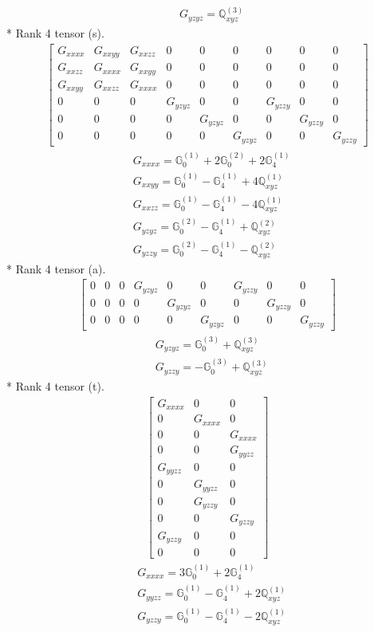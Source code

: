 \documentclass[fleqn,8pt,landscape]{jsarticle}
\begin{document}
\begin{align*}
& G_{yzyz} = \mathbb{Q}_{xyz}^{(3)}
\end{align*}
* Rank 4 tensor (s).
\begin{align*}
\begin{bmatrix} G_{xxxx} & G_{xxyy} & G_{xxzz} & 0 & 0 & 0 & 0 & 0 & 0 \\ G_{xxzz} & G_{xxxx} & G_{xxyy} & 0 & 0 & 0 & 0 & 0 & 0 \\ G_{xxyy} & G_{xxzz} & G_{xxxx} & 0 & 0 & 0 & 0 & 0 & 0 \\ 0 & 0 & 0 & G_{yzyz} & 0 & 0 & G_{yzzy} & 0 & 0 \\ 0 & 0 & 0 & 0 & G_{yzyz} & 0 & 0 & G_{yzzy} & 0 \\ 0 & 0 & 0 & 0 & 0 & G_{yzyz} & 0 & 0 & G_{yzzy} \end{bmatrix}
\end{align*}
\begin{align*}
& G_{xxxx} = \mathbb{G}_{0}^{(1)} + 2 \mathbb{G}_{0}^{(2)} + 2 \mathbb{G}_{4}^{(1)} \\
& G_{xxyy} = \mathbb{G}_{0}^{(1)} - \mathbb{G}_{4}^{(1)} + 4 \mathbb{Q}_{xyz}^{(1)} \\
& G_{xxzz} = \mathbb{G}_{0}^{(1)} - \mathbb{G}_{4}^{(1)} - 4 \mathbb{Q}_{xyz}^{(1)} \\
& G_{yzyz} = \mathbb{G}_{0}^{(2)} - \mathbb{G}_{4}^{(1)} + \mathbb{Q}_{xyz}^{(2)} \\
& G_{yzzy} = \mathbb{G}_{0}^{(2)} - \mathbb{G}_{4}^{(1)} - \mathbb{Q}_{xyz}^{(2)}
\end{align*}
* Rank 4 tensor (a).
\begin{align*}
\begin{bmatrix} 0 & 0 & 0 & G_{yzyz} & 0 & 0 & G_{yzzy} & 0 & 0 \\ 0 & 0 & 0 & 0 & G_{yzyz} & 0 & 0 & G_{yzzy} & 0 \\ 0 & 0 & 0 & 0 & 0 & G_{yzyz} & 0 & 0 & G_{yzzy} \end{bmatrix}
\end{align*}
\begin{align*}
& G_{yzyz} = \mathbb{G}_{0}^{(3)} + \mathbb{Q}_{xyz}^{(3)} \\
& G_{yzzy} = - \mathbb{G}_{0}^{(3)} + \mathbb{Q}_{xyz}^{(3)}
\end{align*}
* Rank 4 tensor (t).
\begin{align*}
\begin{bmatrix} G_{xxxx} & 0 & 0 \\ 0 & G_{xxxx} & 0 \\ 0 & 0 & G_{xxxx} \\ 0 & 0 & G_{yyzz} \\ G_{yyzz} & 0 & 0 \\ 0 & G_{yyzz} & 0 \\ 0 & G_{yzzy} & 0 \\ 0 & 0 & G_{yzzy} \\ G_{yzzy} & 0 & 0 \\ 0 & 0 & 0 \end{bmatrix}
\end{align*}
\begin{align*}
& G_{xxxx} = 3 \mathbb{G}_{0}^{(1)} + 2 \mathbb{G}_{4}^{(1)} \\
& G_{yyzz} = \mathbb{G}_{0}^{(1)} - \mathbb{G}_{4}^{(1)} + 2 \mathbb{Q}_{xyz}^{(1)} \\
& G_{yzzy} = \mathbb{G}_{0}^{(1)} - \mathbb{G}_{4}^{(1)} - 2 \mathbb{Q}_{xyz}^{(1)}
\end{align*}
\end{document}
